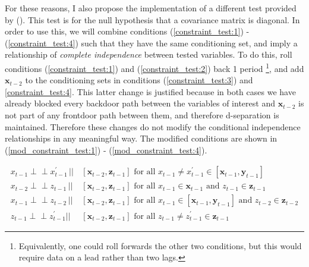 \documentclass{article}
\def\indep{\perp \!\!\! \perp}
\begin{document}
For these reasons, I also propose the implementation of a different test provided by \citeauthor{srivastava2005some} (\citeyear{srivastava2005some}). This test is for the null hypothesis that a covariance matrix is diagonal. In order to use this, we will combine conditions (\ref{constraint_test:1}) - (\ref{constraint_test:4}) such that they have the same conditioning set, and imply a relationship of \textit{complete independence} between tested variables. To do this, roll conditions (\ref{constraint_test:1}) and (\ref{constraint_test:2}) back 1 period \footnote{Equivalently, one could roll forwards the other two conditions, but this would require data on a lead rather than two lags.}, and add $\mathbf{x}_{t-2}$ to the conditioning sets in conditions (\ref{constraint_test:3}) and \ref{constraint_test:4}. This latter change is justified because in both cases we have already blocked every backdoor path between the variables of interest and $\mathbf{x}_{t-2}$ is not part of any frontdoor path between them, and therefore d-separation is maintained. Therefore these changes do not modify the conditional independence relationships in any meaningful way. The modified conditions are shown in (\ref{mod_constraint_test:1}) - (\ref{mod_constraint_test:4}).

\begin{align}
  x_{t-1} \indep x^{\prime}_{t-1} \,||\,& [\mathbf{x}_{t-2},\mathbf{z}_{t-1}] \text{ for all } x_{t-1} \neq x^{\prime}_{t-1} \in [\mathbf{x}_{t-1}, \mathbf{y}_{t-1}] \label{mod_constraint_test:1} \\
  x_{t-2} \indep z_{t-1} \,||\,& [\mathbf{x}_{t-2},\mathbf{z}_{t-1}] \text{ for all } x_{t-1} \in \mathbf{x}_{t-1} \text{ and } z_{t-1} \in \mathbf{z}_{t-1} \label{mod_constraint_test:3} \\
  x_{t-1} \indep z_{t-2} \,||\,& [\mathbf{x}_{t-2},\mathbf{z}_{t-1}] \text{ for all } x_{t-1} \in [\mathbf{x}_{t-1}, \mathbf{y}_{t-1}] \text{ and } z_{t-2} \in \mathbf{z}_{t-2} \label{mod_constraint_test:2} \\
  z_{t-1} \indep z^{\prime}_{t-1} || & [\mathbf{x}_{t-2},\mathbf{z}_{t-1}] \text{ for all } z_{t-1} \not = z^{\prime}_{t-1} \in \mathbf{z}_{t-1} \label{mod_constraint_test:4}
\end{align}
\end{document}
